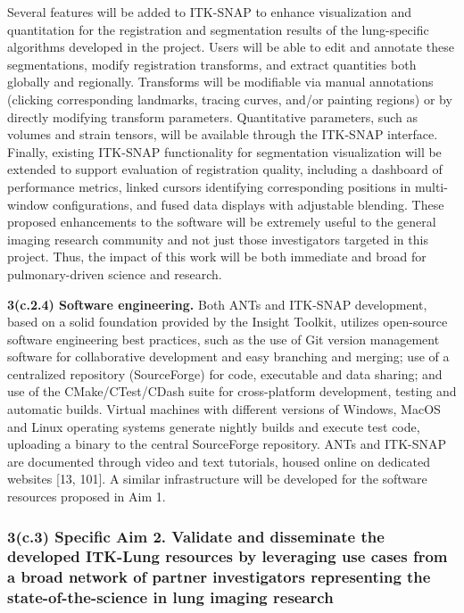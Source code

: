 \documentclass[11pt,]{article}
\begin{document}
Several features will be added to ITK-SNAP to enhance visualization and
quantitation for the registration and segmentation results of the
lung-specific algorithms developed in the project. Users will be able to
edit and annotate these segmentations, modify registration transforms,
and extract quantities both globally and regionally. Transforms will be
modifiable via manual annotations (clicking corresponding landmarks,
tracing curves, and/or painting regions) or by directly modifying
transform parameters. Quantitative parameters, such as volumes and
strain tensors, will be available through the ITK-SNAP interface.
Finally, existing ITK-SNAP functionality for segmentation visualization
will be extended to support evaluation of registration quality,
including a dashboard of performance metrics, linked cursors identifying
corresponding positions in multi-window configurations, and fused data
displays with adjustable blending. These proposed enhancements to the
software will be extremely useful to the general imaging research
community and not just those investigators targeted in this project.
Thus, the impact of this work will be both immediate and broad for
pulmonary-driven science and research.

\textbf{3(c.2.4) Software engineering.} Both ANTs and ITK-SNAP
development, based on a solid foundation provided by the Insight
Toolkit, utilizes open-source software engineering best practices, such
as the use of Git version management software for collaborative
development and easy branching and merging; use of a centralized
repository (SourceForge) for code, executable and data sharing; and use
of the CMake/CTest/CDash suite for cross-platform development, testing
and automatic builds. Virtual machines with different versions of
Windows, MacOS and Linux operating systems generate nightly builds and
execute test code, uploading a binary to the central SourceForge
repository. ANTs and ITK-SNAP are documented through video and text
tutorials, housed online on dedicated websites {[}13, 101{]}. A similar
infrastructure will be developed for the software resources proposed in
Aim 1.

\subsubsection{3(c.3) \textbf{Specific Aim 2.} Validate and disseminate
the developed ITK-Lung resources by leveraging use cases from a broad
network of partner investigators representing the state-of-the-science
in lung imaging
research}\label{c.3-specific-aim-2.-validate-and-disseminate-the-developed-itk-lung-resources-by-leveraging-use-cases-from-a-broad-network-of-partner-investigators-representing-the-state-of-the-science-in-lung-imaging-research}
\end{document}
